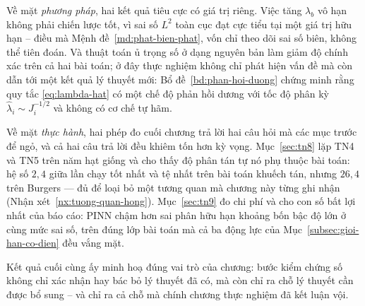 Về mặt \emph{phương pháp}, hai kết quả tiêu cực có giá trị riêng. Việc tăng
$\lambda_b$ vô hạn không phải chiến lược tốt, vì sai số $L^2$ toàn cục đạt cực
tiểu tại một giá trị hữu hạn -- điều mà Mệnh đề~\ref{md:phat-bien-phat}, vốn chỉ
theo dõi sai số biên, không thể tiên đoán. Và thuật toán ủ trọng số ở dạng nguyên
bản làm giảm độ chính xác trên cả hai bài toán; ở đây thực nghiệm không chỉ phát
hiện vấn đề mà còn dẫn tới một kết quả lý thuyết mới:
Bổ đề~\ref{bd:phan-hoi-duong} chứng minh rằng quy tắc \eqref{eq:lambda-hat} có một
chế độ phản hồi dương với tốc độ phân kỳ $\hat\lambda_i \sim J_i^{-1/2}$ và không
có cơ chế tự hãm.
 
Về mặt \emph{thực hành}, hai phép đo cuối chương trả lời hai câu hỏi mà các mục
trước để ngỏ, và cả hai câu trả lời đều khiêm tốn hơn kỳ vọng. Mục~\ref{sec:tn8}
lặp TN4 và TN5 trên năm hạt giống và cho thấy độ phân tán tự nó phụ thuộc bài
toán: hệ số $2{,}4$ giữa lần chạy tốt nhất và tệ nhất trên bài toán khuếch tán,
nhưng $26{,}4$ trên Burgers --- đủ để loại bỏ một tương quan mà chương này từng
ghi nhận (Nhận xét~\ref{nx:tuong-quan-hong}). Mục~\ref{sec:tn9} đo chi phí và
cho con số bất lợi nhất của báo cáo: PINN chậm hơn sai phân hữu hạn khoảng bốn
bậc độ lớn ở cùng mức sai số, trên đúng lớp bài toán mà cả ba động lực của
Mục~\ref{subsec:gioi-han-co-dien} đều vắng mặt.

Kết quả cuối cùng ấy minh hoạ đúng vai trò của chương: bước kiểm chứng số không
chỉ xác nhận hay bác bỏ lý thuyết đã có, mà còn chỉ ra chỗ lý thuyết cần được bổ
sung -- và chỉ ra cả chỗ mà chính chương thực nghiệm đã kết luận vội.
 
